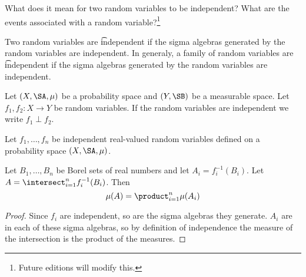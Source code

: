 

What does it mean for
two random variables to
be independent?
What are the events associated
with a random variable?\footnote{Future editions will modify this.}


Two random variables are \t{independent} if the sigma algebras generated by the random variables are independent.
In generaly, a family of random variables are \t{independent} if the sigma algebras generated by the random variables are independent.


Let $(X, \SA, \mu)$ be a probability space and $(Y, \SB)$ be a measurable space.
Let $f_1,f_2: X \to Y$ be random variables.
If the random variables are independent we write $f_1 \perp f_2$.


\begin{prop}
Let $f_1, \dots, f_n$
be independent real-valued
random variables
defined on a probability
space $(X, \SA, \mu)$.

Let $B_1, \dots, B_n$
be Borel sets of
real numbers
and let $A_i = f_i^{-1}(B_i)$.
Let $A = \intersect_{i = 1}^{n} f_i^{-1}(B_i)$.
Then
\[
  \mu(A)
  = \product_{i = 1}^{n} \mu(A_i)
\]
  \begin{proof}
    Since $f_i$ are independent, so
    are the sigma algebras they generate.
    $A_i$ are in each of these sigma
    algebras, so by definition of
    independence the measure of
    the intersection
    is the product of the measures.
  \end{proof}
\end{prop}
